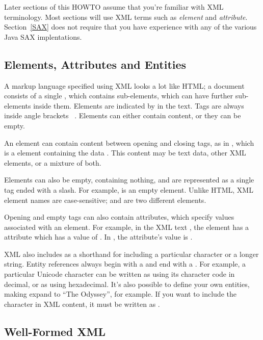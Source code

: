 \documentclass{howto}
\newcommand{\element}[1]{\code{#1}}
\newcommand{\attribute}[1]{\code{#1}}
\begin{document}
Later sections of this HOWTO assume that you're familiar with XML
terminology.  Most sections will use XML terms such as \emph{element}
and \emph{attribute}.  Section~\ref{SAX} does not require that you
have experience with any of the various Java SAX implentations.


\subsection{Elements, Attributes and Entities}

A markup language specified using XML looks a lot like HTML; a
document consists of a single , which contains
sub-elements, which can have further sub-elements inside them.
Elements are indicated by  in the text.  Tags are always
inside angle brackets \code{<}~\code{>}.  Elements can either contain
content, or they can be empty.

An element can contain content between opening and closing
tags, as in , which is a \element{name}
element containing the data . This content may be text
data, other XML elements, or a mixture of both. 

Elements can also be empty, containing nothing, and are represented as
a single tag ended with a slash.  For example,  is an
empty \element{stop} element.  Unlike HTML, XML element names are
case-sensitive; \element{stop} and \element{Stop} are two different
elements.

Opening and empty tags can also contain attributes, which specify
values associated with an element.  For example, in the XML text
, the \element{name} element
has a \attribute{lang} attribute which has a value of .
In , 
the attribute's value is .

XML also includes  as a shorthand for including a
particular character or a longer string.  Entity references always
begin with a \samp{\&} and end with a \samp{;}.  For example, a
particular Unicode character can be written as  using
its character code in decimal, or as  using
hexadecimal.  It's also possible to define your own entities, making
 expand to ``The Odyssey'', for example.  If you want to
include the \samp{\&} character in XML content, it must be written as
.


\subsection{Well-Formed XML}
\end{document}
